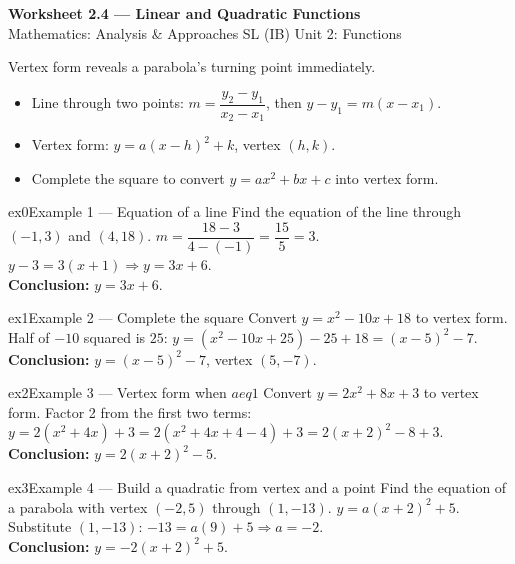 \documentclass[11pt]{article}
\begin{document}
\begin{center}
{\LARGE\bfseries\color{titleblue}Worksheet 2.4 --- Linear and Quadratic Functions}\\[2pt]
{\small Mathematics: Analysis \& Approaches SL (IB) \textperiodcentered{} Unit 2: Functions}
\end{center}

\begin{ideabox}
Vertex form reveals a parabola's turning point immediately.
\begin{itemize}[leftmargin=*,itemsep=2pt]
  \item Line through two points: $m=\dfrac{y_2-y_1}{x_2-x_1}$, then $y-y_1=m(x-x_1)$.
  \item Vertex form: $y=a(x-h)^2+k$, vertex $(h,k)$.
  \item Complete the square to convert $y=ax^2+bx+c$ into vertex form.
\end{itemize}
\end{ideabox}


\begin{example}{ex0}{Example 1 --- Equation of a line}
Find the equation of the line through $(-1,3)$ and $(4,18)$.\soln
$m=\dfrac{18-3}{4-(-1)}=\dfrac{15}{5}=3$. $y-3=3(x+1)\Rightarrow y=3x+6$.\\[3pt]\textbf{Conclusion:} $y=3x+6$.
\end{example}

\begin{example}{ex1}{Example 2 --- Complete the square}
Convert $y=x^2-10x+18$ to vertex form.\soln
Half of $-10$ squared is $25$: $y=(x^2-10x+25)-25+18=(x-5)^2-7$.\\[3pt]\textbf{Conclusion:} $y=(x-5)^2-7$, vertex $(5,-7)$.
\end{example}

\begin{example}{ex2}{Example 3 --- Vertex form when $a
eq1$}
Convert $y=2x^2+8x+3$ to vertex form.\soln
Factor 2 from the first two terms: $y=2(x^2+4x)+3=2(x^2+4x+4-4)+3=2(x+2)^2-8+3$.\\[3pt]\textbf{Conclusion:} $y=2(x+2)^2-5$.
\end{example}

\begin{example}{ex3}{Example 4 --- Build a quadratic from vertex and a point}
Find the equation of a parabola with vertex $(-2,5)$ through $(1,-13)$.\soln
$y=a(x+2)^2+5$. Substitute $(1,-13)$: $-13=a(9)+5\Rightarrow a=-2$.\\[3pt]\textbf{Conclusion:} $y=-2(x+2)^2+5$.
\end{example}
\end{document}

